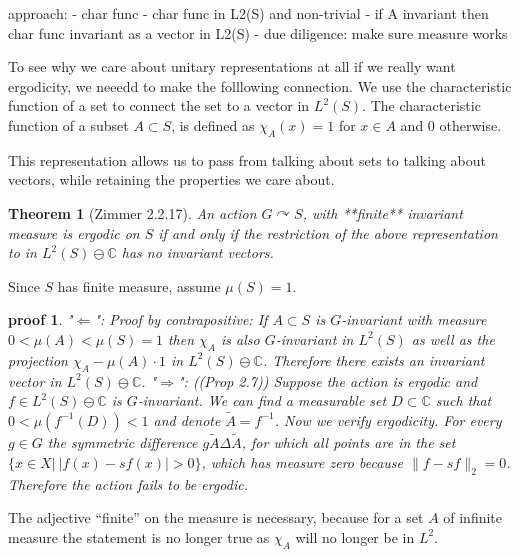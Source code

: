 \documentclass[
  12pt
]{article}
\theoremstyle{break}
\newtheorem{thm}{Theorem}
\theoremstyle{plain}
\newtheorem*{pf}{proof}
\begin{document}
  approach: - char func - char func in L2(S) and non-trivial - if A
  invariant then char func invariant as a vector in L2(S) - due diligence:
  make sure measure works

  To see why we care about unitary representations at all if we really
  want ergodicity, we neeedd to make the folllowing connection. We use the
  characteristic function of a set to connect the set to a vector in
  $L^2(S)$. The characteristic function of a subset $A\subset S$, is
  defined as $\chi_A(x) = 1$ for $x \in A$ and $0$ otherwise.

  This representation allows us to pass from talking about sets to talking
  about vectors, while retaining the properties we care about.

  \begin{thm}[Zimmer 2.2.17]
    \label{thm:2.2.17}
    An action $G\curvearrowright S$, with **finite** invariant measure is ergodic
    on $S$ if and only if the restriction of the above representation to  in
    $L^2(S) \ominus \mathbb{C}$ has no invariant vectors.
  \end{thm}
    
  Since $S$ has finite measure, assume $\mu(S) =1$.

  \begin{pf}
    "$\Leftarrow$": Proof by contrapositive: If $A\subset S$ is $G$-invariant
    with measure $0 < \mu(A) < \mu(S) = 1$ then $\chi_A$ is also $G$-invariant
    in $L^2(S)$ as well as the projection $\chi_A - \mu(A)\cdot 1$ in
    $L^2(S)\ominus \mathbb{C}$. Therefore there exists an invariant vector in
    $L^2(S)\ominus \mathbb{C}$. "$\Rightarrow$": (\cite{Kerr16}(Prop 2.7))
    Suppose the action is ergodic and $f\in L^2(S)\ominus \mathbb{C}$ is
    $G$-invariant. We can find a measurable set $D\subset \mathbb{C}$ such that
    $0<\mu(f^{-1}(D)) < 1$ and denote $\widetilde{A} = f^{-1}$. Now we verify
    ergodicity. For every $g\in G$ the symmetric difference $g\widetilde{A}
    \Delta \widetilde{A}$, for which all points are in the set $\{x \in X | \
    |f(x)-sf(x)| > 0\}$, which has measure zero because $\|f- sf\|_2=0$.
    Therefore the action fails to be ergodic.
  \end{pf}

  The adjective ``finite'' on the measure is necessary, because for a set
  $A$ of infinite measure the statement is no longer true as $\chi_A$
  will no longer be in $L^2$.

\end{document}
